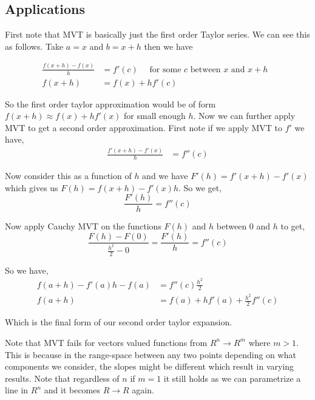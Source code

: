 \subsection{Applications}
First note that MVT is basically just the first order Taylor series. We can see this as follows. Take $a = x$ and $b = x + h$ then we have

\begin{align*}
    \frac{ f(x + h) - f(x)}{h} &= f'(c)\quad \text{ for some $c$ between $x$ and $x + h$ }\\
    f(x + h) &= f(x) + hf'(c)
\end{align*}    

So the first order taylor approximation would be of form $f(x + h) \approx f(x) + h f'(x)$ for small enough $h$. Now we can further apply MVT to get a second order approximation. First note if we apply MVT to $f'$ we have, 
\begin{align*}
    \frac{f'(x + h) - f'(x)}{h} &= f''(c)
\end{align*}

Now consider this as a function of $h$ and we have $F'(h) = f'(x + h) - f'(x)$ which gives us $F(h) = f(x + h) - f'(x)h$. So we get, 
\[
    \frac{F'(h)}{h} = f''(c)
\]


Now apply Cauchy MVT on the functions $F(h)$ and $h$ between $0$ and $h$ to get, 
\[
   \frac{F(h)  - F(0)}{\frac{h^2}{2} - 0} = \frac{F'(h)}{h} = f''(c)
\]

So we have, 
\begin{align*}
    f(a + h)  - f'(a)h - f(a) &= f''(c) \frac{h^2}{2}\\
                            f(a + h)&=  f(a) + hf'(a) + \frac{h^2}{2}f''(c)
\end{align*}

Which is the final form of our second order taylor expansion.

\begin{note}
    Note that MVT fails for vectors valued functions from $R^{n} \to R^{m}$ where $m > 1$. This is because in the range-space between any two points depending on what components we consider, the slopes might be different which result in varying results. Note that regardless of $n$ if $m = 1$ it still holds as we can parametrize a line in $R^{n}$ and it becomes $R \to R$ again.
\end{note}


